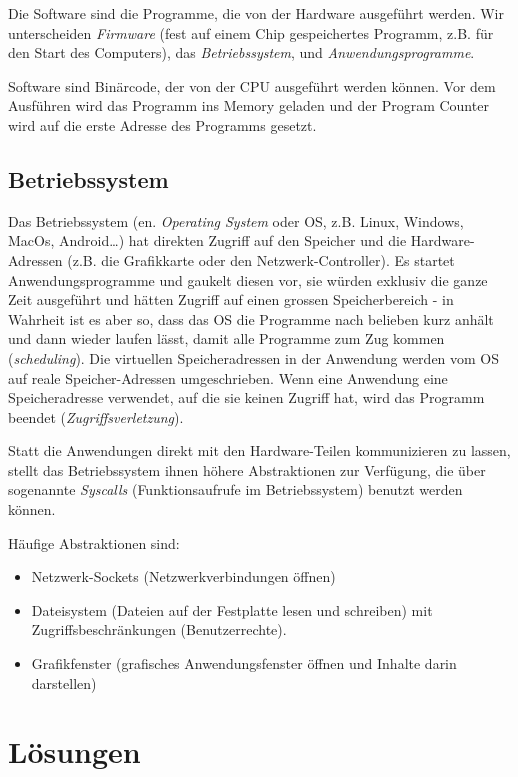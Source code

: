 Die Software sind die Programme, die von der Hardware ausgeführt werden. Wir unterscheiden \emph{Firmware} (fest auf einem Chip gespeichertes Programm, z.B. für den Start des Computers), das \emph{Betriebssystem}, und \emph{Anwendungsprogramme}.

Software sind Binärcode, der von der CPU ausgeführt werden können. Vor dem Ausführen wird das Programm ins Memory geladen und der Program Counter wird auf die erste Adresse des Programms gesetzt.

\subsection{Betriebssystem}

Das Betriebssystem (en. \emph{Operating System} oder OS, z.B. Linux, Windows, MacOs, Android…) hat direkten Zugriff auf den Speicher und die Hardware-Adressen (z.B. die Grafikkarte oder den Netzwerk-Controller). Es startet Anwendungsprogramme und gaukelt diesen vor, sie würden exklusiv die ganze Zeit ausgeführt und hätten Zugriff auf einen grossen Speicherbereich - in Wahrheit ist es aber so, dass das OS die Programme nach belieben kurz anhält und dann wieder laufen lässt, damit alle Programme zum Zug kommen (\emph{scheduling}). Die virtuellen Speicheradressen in der Anwendung werden vom OS auf reale Speicher-Adressen umgeschrieben. Wenn eine Anwendung eine Speicheradresse verwendet, auf die sie keinen Zugriff hat, wird das Programm beendet (\emph{Zugriffsverletzung}). 

Statt die Anwendungen direkt mit den Hardware-Teilen kommunizieren zu lassen, stellt das Betriebssystem ihnen höhere Abstraktionen zur Verfügung, die über sogenannte \emph{Syscalls} (Funktionsaufrufe im Betriebssystem) benutzt werden können.

Häufige Abstraktionen sind:

\begin{itemize}
    \item Netzwerk-Sockets (Netzwerkverbindungen öffnen)
    \item Dateisystem (Dateien auf der Festplatte lesen und schreiben) mit Zugriffsbeschränkungen (Benutzerrechte).
    \item Grafikfenster (grafisches Anwendungsfenster öffnen und Inhalte darin darstellen)
\end{itemize}


\newpage

\section*{Lösungen}
\printsolutions




